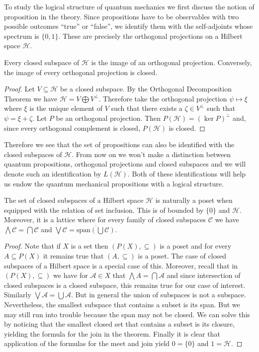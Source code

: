 To study the logical structure of quantum mechanics we first discuss the notion of proposition in the theory. Since propositions have to be observables with two possible outcomes ``true'' or ``false'', we identify them with the self-adjoints whose spectrum is $\{0,1\}$. These are precisely the orthogonal projections on a Hilbert space $\mathcal{H}$.

\begin{theorem}
Every closed subspace of $\mathcal{H}$ is the image of an orthogonal projection. Conversely, the image of every orthogonal projection is closed.
\end{theorem}
\begin{proof}
Let $V\subseteq\mathcal{H}$ be a closed subspace.  By the Orthogonal Decomposition Theorem we have $\mathcal{H}=V\bigoplus V^{\bot}$. Therefore take the orthogonal projection $\psi\mapsto\xi$ where $\xi$ is the unique element of $V$ such that there exists a $\zeta\in V^{\bot}$ such that $\psi=\xi+\zeta$.
Let $P$ be an orthogonal projection. Then $P(\mathcal{H})=(\ker P)^{\bot}$ and, since every orthogonal complement is closed, $P(\mathcal{H})$ is closed.
\end{proof}

Therefore we see that the set of propositions can also be identified with the closed subspaces of $\mathcal{H}$. From now on we won't make a distinction between quantum propositions, orthogonal projections and closed subspaces and we will denote such an identification by $L(\mathcal{H})$. Both of these identifications will help us endow the quantum mechanical propositions with a logical structure.

\begin{theorem}\label{thm:quantum_complements}
The set of closed subspaces of a Hilbert space $\mathcal{H}$ is naturally a poset when equipped with the relation of set inclusion. This is of bounded by $\{0\}$ and $\mathcal{H}$. Moreover, it is a lattice where for every family of closed subspaces $\mathcal{C}$ we have $\bigwedge \mathcal{C} = \bigcap \mathcal{C}$ and $\bigvee \mathcal{C} = \overline{\text{span}\left(\bigcup\mathcal{C}\right)}$.
\end{theorem}

\begin{proof}
Note that if $X$ is a set then $(P(X),\subseteq)$ is a poset and for every $A\subseteq P(X)$ it remains true that $(A,\subseteq)$ is a poset. The case of closed subspaces of a Hilbert space is a special case of this. Moreover, recall that in $(P(X),\subseteq)$ we have for $\mathcal{A}\in X$ that $\bigwedge A = \bigcap \mathcal{A}$ and since intersection of closed subspaces is a closed subspace, this remains true for our case of interest. Similarly $\bigvee\mathcal{A}=\bigcup\mathcal{A}$. But in general the union of subspaces is not a subspace. Nevertheless, the smallest subspace that contains a subset is its span. But we may still run into trouble because the span may not be closed. We can solve this by noticing that the smallest closed set that contains a subset is its closure, yielding the formula for the join in the theorem. Finally it is clear that application of the formulas for the meet and join yield $0=\{0\}$ and $1=\mathcal{H}$. 
\end{proof}

